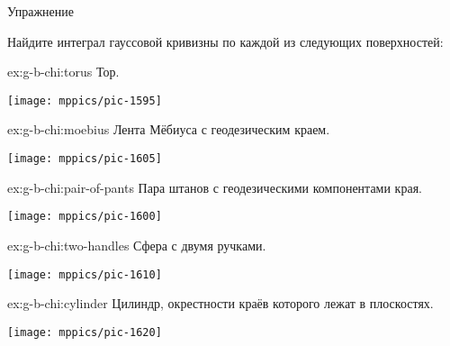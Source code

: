 \begin{thm}{Упражнение}\label{ex:g-b-chi}
{\sloppy
Найдите интеграл гауссовой кривизны по каждой из следующих поверхностей:

}

\setlength{\columnseprule}{0.4pt}
\begin{multicols}{2}

\begin{subthm}{ex:g-b-chi:torus}
Тор.
\end{subthm}

\begin{Figure}
\vskip-0mm
\centering
\texttt{[image: mppics/pic-1595]}
\end{Figure}

\begin{subthm}{ex:g-b-chi:moebius}
Лента Мёбиуса с геодезическим краем.
\end{subthm}

\begin{Figure}
\vskip-0mm
\centering
\texttt{[image: mppics/pic-1605]}
\end{Figure}

\begin{subthm}{ex:g-b-chi:pair-of-pants}
Пара штанов с геодезическими компонентами края.
\end{subthm}
\begin{Figure}
\vskip-0mm
\centering
\texttt{[image: mppics/pic-1600]}
\end{Figure}

\begin{subthm}{ex:g-b-chi:two-handles}
Сфера с двумя ручками.
\end{subthm}

\begin{Figure}
\vskip-0mm
\centering
\texttt{[image: mppics/pic-1610]}
\end{Figure}

\end{multicols}

\begin{subthm}{ex:g-b-chi:cylinder}
Цилиндр, окрестности краёв которого лежат в плоскостях.
\begin{Figure}
\vskip-0mm
\centering
\texttt{[image: mppics/pic-1620]}
\end{Figure}
\end{subthm}

\end{thm}
